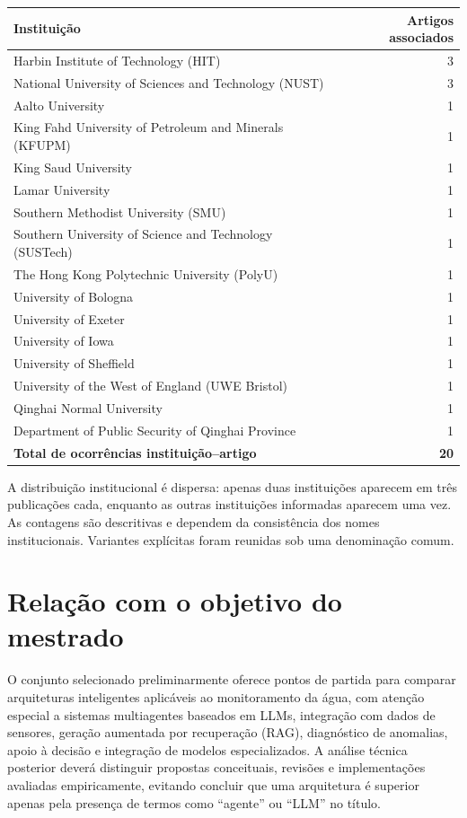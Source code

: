 \begin{center}
\small
\begin{tabular}{p{8.0cm}r}
\hline
\textbf{Instituição} & \textbf{Artigos associados} \\
\hline
Harbin Institute of Technology (HIT) & 3 \\
National University of Sciences and Technology (NUST) & 3 \\
Aalto University & 1 \\
King Fahd University of Petroleum and Minerals (KFUPM) & 1 \\
King Saud University & 1 \\
Lamar University & 1 \\
Southern Methodist University (SMU) & 1 \\
Southern University of Science and Technology (SUSTech) & 1 \\
The Hong Kong Polytechnic University (PolyU) & 1 \\
University of Bologna & 1 \\
University of Exeter & 1 \\
University of Iowa & 1 \\
University of Sheffield & 1 \\
University of the West of England (UWE Bristol) & 1 \\
Qinghai Normal University & 1 \\
Department of Public Security of Qinghai Province & 1 \\
\hline
\textbf{Total de ocorrências instituição--artigo} & \textbf{20} \\
\hline
\end{tabular}
\end{center}

A distribuição institucional é dispersa: apenas duas instituições aparecem em três publicações cada, enquanto as outras instituições informadas aparecem uma vez. As contagens são descritivas e dependem da consistência dos nomes institucionais. Variantes explícitas foram reunidas sob uma denominação comum.

\section{Relação com o objetivo do mestrado}

O conjunto selecionado preliminarmente oferece pontos de partida para comparar arquiteturas inteligentes aplicáveis ao monitoramento da água, com atenção especial a sistemas multiagentes baseados em LLMs, integração com dados de sensores, geração aumentada por recuperação (RAG), diagnóstico de anomalias, apoio à decisão e integração de modelos especializados. A análise técnica posterior deverá distinguir propostas conceituais, revisões e implementações avaliadas empiricamente, evitando concluir que uma arquitetura é superior apenas pela presença de termos como ``agente'' ou ``LLM'' no título.

